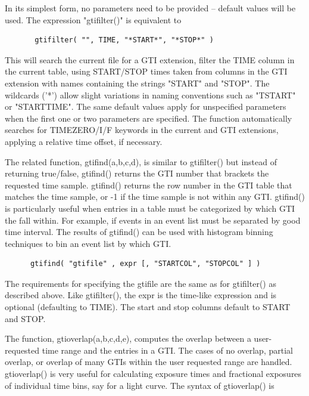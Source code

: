 \documentclass[11pt]{book}
\begin{document}
    In  its  simplest form, no parameters need to be provided -- default
    values will be used.  The expression "gtifilter()" is equivalent to

\begin{verbatim}
       gtifilter( "", TIME, "*START*", "*STOP*" )
\end{verbatim}
    This will search the current file for a GTI  extension,  filter  the
    TIME  column in the current table, using START/STOP times taken from
    columns in the GTI  extension  with  names  containing  the  strings
    "START"  and "STOP".  The wildcards ('*') allow slight variations in
    naming conventions  such  as  "TSTART"  or  "STARTTIME".   The  same
    default  values  apply for unspecified parameters when the first one
    or  two  parameters  are  specified.   The  function   automatically
    searches   for   TIMEZERO/I/F   keywords  in  the  current  and  GTI
    extensions, applying a relative time offset, if necessary.

    The related function, gtifind(a,b,c,d), is similar to gtifilter()
    but instead of returning true/false, gtifind() returns the GTI
    number that brackets the requested time sample.  gtifind() returns
    the row number in the GTI table that matches the time sample, or
    -1 if the time sample is not within any GTI.  gtifind() is
    particularly useful when entries in a table must be categorized by
    which GTI the fall within.  For example, if events in an event
    list must be separated by good time interval.  The results of
    gtifind() can be used with histogram binning techniques to bin an
    event list by which GTI.
    
\begin{verbatim}
      gtifind( "gtifile" , expr [, "STARTCOL", "STOPCOL" ] )
\end{verbatim}

    The requirements for specifying the gtifile are the same as for
    gtifilter() as described above.  Like gtifilter(), the expr is
    the time-like expression and is optional (defaulting to TIME).
    The start and stop columns default to START and STOP.

    The function, gtioverlap(a,b,c,d,e), computes the overlap
    between a user-requested time range and the entries in a GTI.  The
    cases of no overlap, partial overlap, or overlap of many GTIs
    within the user requested range are handled.  gtioverlap() is very
    useful for calculating exposure times and fractional exposures of
    individual time bins, say for a light curve.  The syntax of
    gtioverlap() is
\end{document}
